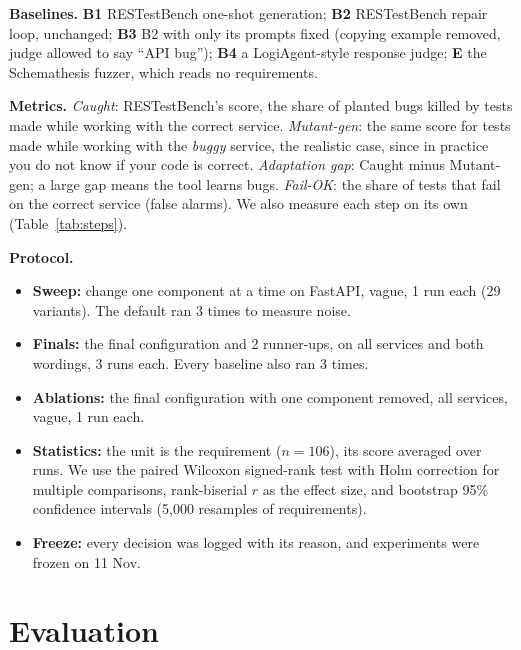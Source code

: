 \documentclass[11pt,a4paper]{article}
\begin{document}
\textbf{Baselines.} \textbf{B1} RESTestBench one-shot generation; \textbf{B2} RESTestBench repair loop, unchanged; \textbf{B3} B2 with only its prompts fixed (copying example removed, judge allowed to say ``API bug''); \textbf{B4} a LogiAgent-style response judge; \textbf{E} the Schemathesis fuzzer, which reads no requirements.

\textbf{Metrics.}
\emph{Caught}: RESTestBench's score, the share of planted bugs killed by tests made while working with the correct service.
\emph{Mutant-gen}: the same score for tests made while working with the \emph{buggy} service, the realistic case, since in practice you do not know if your code is correct.
\emph{Adaptation gap}: Caught minus Mutant-gen; a large gap means the tool learns bugs.
\emph{Fail-OK}: the share of tests that fail on the correct service (false alarms).
We also measure each step on its own (Table~\ref{tab:steps}).

\textbf{Protocol.}
\begin{itemize}
\item \textbf{Sweep:} change one component at a time on FastAPI, vague, 1 run each (29 variants). The default ran 3 times to measure noise.
\item \textbf{Finals:} the final configuration and 2 runner-ups, on all services and both wordings, 3 runs each. Every baseline also ran 3 times.
\item \textbf{Ablations:} the final configuration with one component removed, all services, vague, 1 run each.
\item \textbf{Statistics:} the unit is the requirement ($n=106$), its score averaged over runs. We use the paired Wilcoxon signed-rank test with Holm correction for multiple comparisons, rank-biserial $r$ as the effect size, and bootstrap 95\% confidence intervals (5{,}000 resamples of requirements).
\item \textbf{Freeze:} every decision was logged with its reason, and experiments were frozen on 11 Nov.
\end{itemize}

\section{Evaluation}
\end{document}
